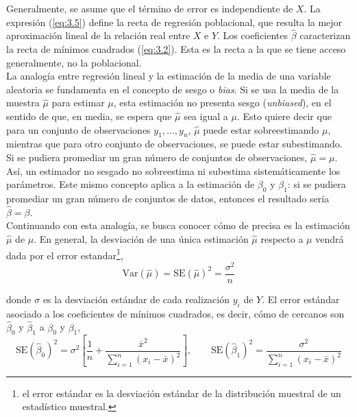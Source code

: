 Generalmente, se asume que el término de error es independiente de $X$. La expresión (\ref{eq:3.5}) define la recta de regresión poblacional, que resulta la mejor aproximación lineal de la relación real entre $X$ e $Y$. Los coeficientes $\hat{\beta}$ caracterizan la recta de mínimos cuadrados (\ref{eq:3.2}). Esta es la recta a la que se tiene acceso generalmente, no la poblacional. \\

La analogía entre regresión lineal y la estimación de la media de una variable aleatoria se fundamenta en el concepto de sesgo o \textit{bias}. Si se usa la media de la muestra $\hat{\mu}$ para estimar $\mu$, esta estimación no presenta sesgo (\textit{unbiased}), en el sentido de que, en media, se espera que $\hat{\mu}$ sea igual a $\mu$. Esto quiere decir que para un conjunto de observaciones $y_1, \dots, y_n$, $\hat{\mu}$ puede estar sobreestimando $\mu$, mientras que para otro conjunto de observaciones, se puede estar subestimando. Si se pudiera promediar un gran número de conjuntos de observaciones, $\hat{\mu} = \mu$. Así, un estimador no sesgado no sobreestima ni subestima sistemáticamente los parámetros. Este mismo concepto aplica a la estimación de $\beta_0$ y $\beta_1$: si se pudiera promediar un gran número de conjuntos de datos, entonces el resultado sería $\hat{\beta} = \beta$. \\

Continuando con esta analogía, se busca conocer cómo de precisa es la estimación $\hat{\mu}$ de $\mu$. En general, la desviación de una única estimación $\hat{\mu}$ respecto a $\mu$ vendrá dada por el error estandar\footnote{el error estándar es la desviación estándar de la distribución muestral de un estadístico muestral.}, 
\begin{equation}
\text{Var}(\hat{\mu}) = \text{SE}(\hat{\mu})^2 = \frac{\sigma^2}{n}
\end{equation}

\noindent donde $\sigma$ es la desviación estándar de cada realización $y_i$ de $Y$. El error estándar asociado a los coeficientes de mínimos cuadrados, es decir, cómo de cercanos son $\hat{\beta}_0$ y $\hat{\beta}_1$ a $\beta_0$ y $\beta_1$, 
\begin{equation}
\text{SE}(\hat{\beta}_0)^2 = \sigma^2 \left[\frac{1}{n} + \frac{\bar{x}^2}{\sum_{i=1}^n (x_i - \bar{x})^2}\right], \qquad \text{SE}(\hat{\beta}_1)^2 = \frac{\sigma^2}{\sum_{i=1}^n (x_i - \bar{x})^2}
\end{equation}

